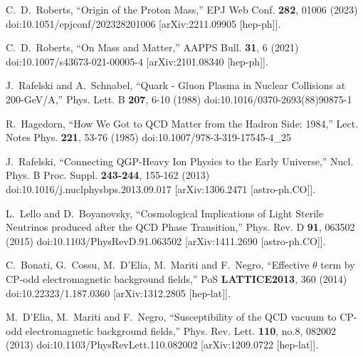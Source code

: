 \documentclass[universe,article,submit,moreauthors,pdftex,a4paper]{Definitions/mdpi}
\begin{document}
\begin{thebibliography}{99}
C.~D.~Roberts,
``Origin of the Proton Mass,''
EPJ Web Conf. \textbf{282}, 01006 (2023)
doi:10.1051/epjconf/202328201006
[arXiv:2211.09905 [hep-ph]].

C.~D.~Roberts,
``On Mass and Matter,''
AAPPS Bull. \textbf{31}, 6 (2021)
doi:10.1007/s43673-021-00005-4
[arXiv:2101.08340 [hep-ph]].

J.~Rafelski and A.~Schnabel,
``Quark - Gluon Plasma in Nuclear Collisions at 200-{GeV}/A,''
Phys. Lett. B \textbf{207}, 6-10 (1988)
doi:10.1016/0370-2693(88)90875-1

R.~Hagedorn,
``How We Got to QCD Matter from the Hadron Side: 1984,''
Lect. Notes Phys. \textbf{221}, 53-76 (1985)
doi:10.1007/978-3-319-17545-4\_25

J.~Rafelski,
``Connecting QGP-Heavy Ion Physics to the Early Universe,''
Nucl. Phys. B Proc. Suppl. \textbf{243-244}, 155-162 (2013)
doi:10.1016/j.nuclphysbps.2013.09.017
[arXiv:1306.2471 [astro-ph.CO]].

L.~Lello and D.~Boyanovsky,
``Cosmological Implications of Light Sterile Neutrinos produced after the QCD Phase Transition,''
Phys. Rev. D \textbf{91}, 063502 (2015)
doi:10.1103/PhysRevD.91.063502
[arXiv:1411.2690 [astro-ph.CO]].

C.~Bonati, G.~Cossu, M.~D'Elia, M.~Mariti and F.~Negro,
``Effective $\theta$ term by CP-odd electromagnetic background fields,''
PoS \textbf{LATTICE2013}, 360 (2014)
doi:10.22323/1.187.0360
[arXiv:1312.2805 [hep-lat]].

M.~D'Elia, M.~Mariti and F.~Negro,
``Susceptibility of the QCD vacuum to CP-odd electromagnetic background fields,''
Phys. Rev. Lett. \textbf{110}, no.8, 082002 (2013)
doi:10.1103/PhysRevLett.110.082002
[arXiv:1209.0722 [hep-lat]].


\end{thebibliography}
\end{document}
